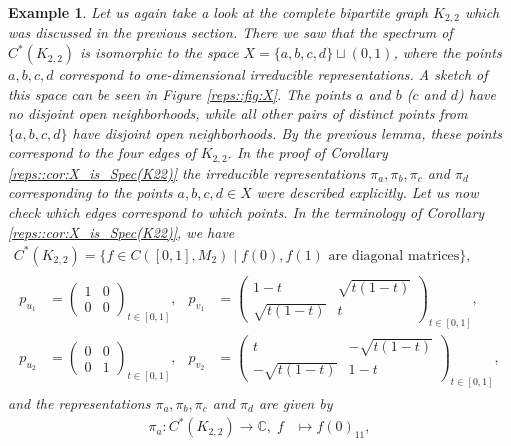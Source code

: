 \documentclass[a4paper]{amsart}
\newtheorem{example}[thm]{Example}
\newcommand{\C}{\mathbb{C}}
\begin{document}
\begin{example}
    \label{reps::ex:edges_and_Spec(C*(K22))}
    Let us again take a look at the complete bipartite graph $K_{2,2}$ which was discussed in the previous section. There we saw that the spectrum of $C^\ast(K_{2,2})$ is isomorphic to the space $X = \{a, b, c, d\} \sqcup (0,1)$, where the points $a, b, c, d$ correspond to one-dimensional irreducible representations. A sketch of this space can be seen in Figure \ref{reps::fig:X}. The points $a$ and $b$ ($c$ and $d$) have no disjoint open neighborhoods, while all other pairs of distinct points from $\{a, b, c, d\}$ have disjoint open neighborhoods. By the previous lemma, these points correspond to the four edges of $K_{2,2}$. In the proof of Corollary \ref{reps::cor:X_is_Spec(K22)} the irreducible representations $\pi_a, \pi_b, \pi_c$ and $\pi_d$ corresponding to the points $a, b, c, d \in X$ were described explicitly. Let us now check which edges correspond to which points. In the terminology of Corollary \ref{reps::cor:X_is_Spec(K22)}, we have
    \begin{align*}
        C^\ast(K_{2,2}) = \{f \in C([0,1], M_2) \mid f(0), f(1) \text{ are diagonal matrices}\}, \\
        \begin{aligned}
            p_{u_1} &= \begin{pmatrix}
                1 & 0 \\ 0 & 0
            \end{pmatrix}_{t \in [0,1]},
            &p_{v_1} &= \begin{pmatrix}
                1-t & \sqrt{t(1-t)} \\ \sqrt{t(1-t)} & t
            \end{pmatrix}_{t \in [0,1]}, \\
            p_{u_2} &= \begin{pmatrix}
                0 & 0 \\ 0 & 1
            \end{pmatrix}_{t \in [0,1]},
            &p_{v_2} &= \begin{pmatrix}
                t & -\sqrt{t(1-t)} \\ -\sqrt{t(1-t)} & 1-t
            \end{pmatrix}_{t \in [0,1]},
        \end{aligned}
    \end{align*}
    and the representations $\pi_a, \pi_b, \pi_c$ and $\pi_d$ are given by
    \begin{align*}
        \pi_a: C^\ast(K_{2,2}) \to \C, \; f &\mapsto f(0)_{11},

\end{align*}
\end{example}
\end{document}
